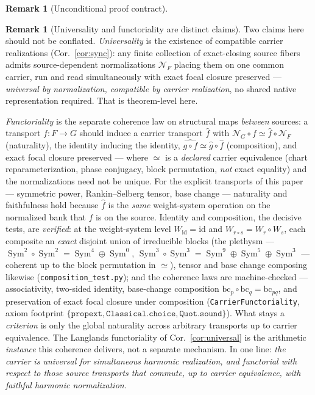 \documentclass[11pt]{article}
\theoremstyle{definition}
\newtheorem{remark}[theorem]{Remark}
\newcommand{\Sym}{\operatorname{Sym}}
\begin{document}
\begin{remark}[Unconditional proof contract]
\begin{enumerate}
\begin{remark}[Universality and functoriality are distinct claims]\label{rem:functor}
Two claims here should not be conflated. \emph{Universality} is the existence of compatible carrier realizations
(Cor.~\ref{cor:sync}): any finite collection of exact-closing source fibers admits source-dependent
normalizations $\mathcal N_F$ placing them on one common carrier, run and read simultaneously with exact focal
closure preserved --- \emph{universal by normalization, compatible by carrier realization}, no shared native
representation required. That is theorem-level here.

\emph{Functoriality} is the separate coherence law on structural maps \emph{between} sources: a transport
$f\colon F\to G$ should induce a carrier transport $\widehat f$ with $\mathcal N_G\circ f\simeq\widehat f\circ
\mathcal N_F$ (naturality), the identity inducing the identity, $\widehat{g\circ f}\simeq\widehat g\circ\widehat
f$ (composition), and exact focal closure preserved --- where $\simeq$ is a \emph{declared} carrier equivalence
(chart reparameterization, phase conjugacy, block permutation, \emph{not} exact equality) and the normalizations
need not be unique. For the explicit transports of this paper --- symmetric power, Rankin--Selberg tensor, base
change --- naturality and faithfulness hold because $\widehat f$ is the \emph{same} weight-system operation on the
normalized bank that $f$ is on the source. Identity and composition, the decisive tests, are \emph{verified}: at
the weight-system level $W_{\mathrm{id}}=\mathrm{id}$ and $W_{r\circ s}=W_r\circ W_s$, each composite an
\emph{exact} disjoint union of irreducible blocks (the plethysm --- $\Sym^2\!\circ\Sym^2=\Sym^4\oplus\Sym^0$,
$\Sym^3\!\circ\Sym^3=\Sym^9\oplus\Sym^5\oplus\Sym^3$ --- coherent up to the block permutation in $\simeq$), tensor
and base change composing likewise (\texttt{composition\_test.py}); and the coherence laws are machine-checked ---
associativity, two-sided identity, base-change composition $\mathrm{bc}_p\circ\mathrm{bc}_q=\mathrm{bc}_{pq}$, and
preservation of exact focal closure under composition (\texttt{CarrierFunctoriality}, axiom footprint
$\{\texttt{propext},\texttt{Classical.choice},\texttt{Quot.sound}\}$). What stays a \emph{criterion} is only the
global naturality across arbitrary transports up to carrier equivalence. The Langlands functoriality of
Cor.~\ref{cor:universal} is the arithmetic \emph{instance} this coherence delivers, not a separate mechanism. In
one line: \emph{the carrier is universal for simultaneous harmonic realization, and functorial with respect to
those source transports that commute, up to carrier equivalence, with faithful harmonic normalization.}
\end{remark}


\end{enumerate}
\end{remark}
\end{document}
